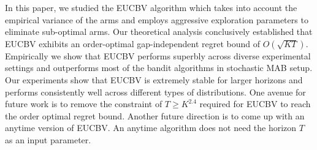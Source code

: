 In this paper, we studied the EUCBV algorithm which takes into account the empirical variance of the arms and employs aggressive exploration parameters to eliminate sub-optimal arms. Our theoretical analysis conclusively established that EUCBV exhibits an order-optimal gap-independent regret bound of $O\left(\sqrt{KT}\right)$. Empirically we show that EUCBV performs superbly across diverse experimental settings and outperforms most of the bandit algorithms in stochastic  MAB setup. Our experiments show that EUCBV is extremely stable for larger horizons and performs consistently well across different types of distributions. One avenue for future work is to remove the constraint of $T\geq K^{2.4}$ required for EUCBV to reach the order optimal regret bound. Another future direction is to come up with an anytime version of EUCBV. An anytime algorithm does not need the horizon $T$ as an input parameter.